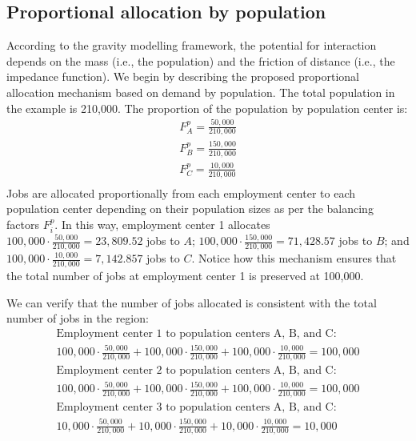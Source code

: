 \documentclass[]{elsarticle} %
\begin{document}
\hypertarget{proportional-allocation-by-population}{%
\subsection{Proportional allocation by
population}\label{proportional-allocation-by-population}}

According to the gravity modelling framework, the potential for
interaction depends on the mass (i.e., the population) and the friction
of distance (i.e., the impedance function). We begin by describing the
proposed proportional allocation mechanism based on demand by
population. The total population in the example is 210,000. The
proportion of the population by population center is: \[
\begin{array}{l}
F^p_A = \frac{50,000}{210,000}\\
F^p_B = \frac{150,000}{210,000}\\
F^p_C = \frac{10,000}{210,000}\\
\end{array}
\] Jobs are allocated proportionally from each employment center to each
population center depending on their population sizes as per the
balancing factors \(F^p_i\). In this way, employment center 1 allocates
\(100,000\cdot \frac{50,000}{210,000}= 23,809.52\) jobs to \(A\);
\(100,000\cdot \frac{150,000}{210,000}= 71,428.57\) jobs to \(B\); and
\(100,000\cdot \frac{10,000}{210,000}= 7,142.857\) jobs to \(C\). Notice
how this mechanism ensures that the total number of jobs at employment
center 1 is preserved at 100,000.

We can verify that the number of jobs allocated is consistent with the
total number of jobs in the region: \[
\begin{array}{l}
\text{Employment center 1 to population centers A, B, and C: }\\
100,000 \cdot \frac{50,000}{210,000} + 100,000 \cdot \frac{150,000}{210,000} + 100,000 \cdot \frac{10,000}{210,000} = 100,000\\
\text{Employment center 2 to population centers A, B, and C: }\\
100,000 \cdot \frac{50,000}{210,000} + 100,000 \cdot \frac{150,000}{210,000} + 100,000 \cdot \frac{10,000}{210,000} = 100,000\\
\text{Employment center 3 to population centers A, B, and C: }\\
10,000 \cdot \frac{50,000}{210,000} + 10,000 \cdot \frac{150,000}{210,000} + 10,000 \cdot \frac{10,000}{210,000} = 10,000\\
\end{array}
\]
\end{document}
